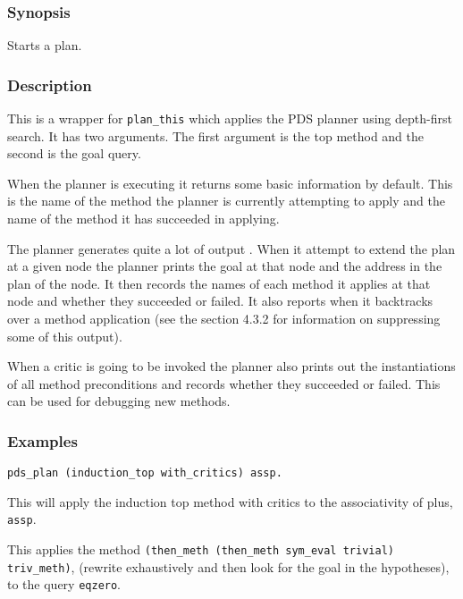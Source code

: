 
\subsubsection*{Synopsis}
Starts a plan.

\subsubsection*{Description}
This is a wrapper for {\tt plan\_this} which applies
the PDS planner using depth-first
search.  It has two arguments.  The first
argument is the top method and the second is the
goal query.

When the planner is executing it returns some basic information by
default.  This is the name of the method the planner is currently
attempting to apply and the name of the method it has succeeded in
applying.

The planner generates quite a lot of output .  When it attempt to extend the plan at a given
node the planner prints the goal at that
node and the address in the plan of the node.  It
then records the names of each method it applies at that node and
whether they succeeded or failed.  It also reports when it backtracks
over a method application (see the section 4.3.2 for information on
suppressing some of this output).

When a critic is going to be invoked the planner also
prints out the instantiations of all method
preconditions and records 
whether they succeeded or failed.  This can be used for debugging new
methods.  

\subsubsection*{Examples}
{\tt pds\_plan (induction\_top with\_critics) assp.} 

\noindent This will apply the induction top method with
critics to the associativity of plus, {\tt assp}.


\noindent This applies the method {\tt  (then\_meth (then\_meth sym\_eval
  trivial)
  triv\_meth)},
(rewrite exhaustively and then look for the goal in the hypotheses),
to the query {\tt eqzero}.

